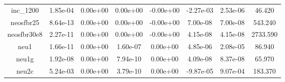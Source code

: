 {{\begin{table}[h]
\begin{center}
{\begin{tabular}{cccccccc}
            inc\_1200 & 1.85e-04 & 0.00e+00 & 0.00e+00 & -0.00e+00 & -2.27e-03 & 2.53e-06 & 46.420 \\ 
           neosfbr25 & 8.64e-13 & 0.00e+00 & 0.00e+00 & -0.00e+00 & 7.00e-08 & 7.00e-08 & 543.240 \\ 
         neosfbr30e8 & 2.27e-11 & 0.00e+00 & 0.00e+00 & -0.00e+00 & 4.15e-08 & 4.15e-08 & 2733.590 \\ 
                neu1 & 1.66e-11 & 0.00e+00 & 1.60e-07 & 0.00e+00 & 4.85e-06 & 2.08e-05 & 86.940 \\ 
               neu1g & 1.92e-08 & 0.00e+00 & 7.94e-10 & 0.00e+00 & 4.09e-08 & 8.37e-08 & 65.970 \\ 
               neu2c & 5.24e-03 & 0.00e+00 & 3.79e-10 & 0.00e+00 & -9.87e-05 & 9.07e-04 & 183.370 \\ 
      \bottomrule
    \end{tabular}
  }  
\end{center}
\end{table}}}

